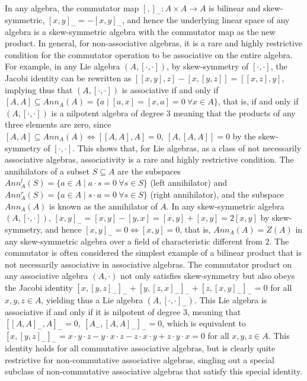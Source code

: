 \documentclass[12pt]{article}
\begin{document}
        In any algebra, the commutator map $[,]_{-}:A\times A\rightarrow A$ is bilinear and skew-symmetric, $[x,y]_{-}=-[x,y]_{-}$, and hence the underlying linear space of any algebra is a skew-symmetric algebra with the commutator map as the new product.
        In general, for non-associative algebras, it is a rare and highly restrictive condition for the commutator operation to be associative on the entire algebra.
         For example, in any Lie algebra $(A,[\cdot,\cdot])$, by skew-symmetry of $[\cdot,\cdot]$, the Jacobi identity can be rewritten as $[[x,y],z]-[x,[y,z]]=[[x,z],y]$, implying thus that $(A,[\cdot,\cdot])$ is associative if and only if $[A,A]\subseteq Ann_A(A)=\{a\mid [a,x]=[x,a]=0 \ \forall x\in A\}$, that is, if and only if $(A,[\cdot,\cdot])$ is a nilpotent algebra of degree $3$ meaning that the products of any three elements are zero, since
         $[A,A]\subseteq Ann_A(A)\Leftrightarrow [[A,A],A]=0,\ [A,[A,A]]=0$ by the skew-symmetry of $[\cdot,\cdot]$. This shows that, for Lie algebras, as a class of not necessarily associative algebras, associativity is a rare and highly restrictive condition. The annihilators of a subset $S\subseteq A$ are the subspaces $Ann_A^l(S)=\{a\in A\mid a\cdot s=0\ \forall s\in S\}$ (left annihilator) and $Ann_A^r(S)=\{a\in A\mid s\cdot a=0\ \forall s\in S\}$ (right annihilator), and the subspace $Ann_A(A)$ is known as the annihilator of $A$. In any skew-symmetric algebra $(A,[\cdot,\cdot])$, $[x,y]_{-}=[x,y]-[y,x]=[x,y]+[x,y]=2[x,y]$ by skew-symmetry, and hence $[x,y]_{-}=0 \Leftrightarrow [x,y]=0$, that is, $Ann_A(A)=Z(A)$ in any skew-symmetric algebra over a field of characteristic different from $2$.
         The commutator is often considered the simplest example of a bilinear product that is not necessarily associative in associative algebras. The commutator product on any associative algebra $(A,\cdot)$ not only satisfies skew-symmetry but also  obeys the Jacobi identity $[x,[y,z]_{-}]_{-}+[y,[z,x]_{-}]_{-}+[z,[x,y]_{-}]_{-}=0$ for all $x,y,z\in A$, yielding thus a Lie algebra
        $(A,[\cdot,\cdot]_{-})$. This Lie algebra is associative if and only if it is nilpotent of degree $3$, meaning that
        $[[A,A]_{-},A]_{-}=0,\ [A_{-},[A,A]_{-}]_{-}=0$, which is equivalent to
        $[x,[y,z]_{-}]_{-}=x\cdot y \cdot z-y\cdot x\cdot z-z\cdot x\cdot y+z\cdot y\cdot x=0$ for all $x,y,z\in A$. This identity holds for all commutative associative algebras, but is clearly quite restrictive for non-commutative associative algebras, singling out a special subclass of non-commutative associative algebras that satisfy this special identity.
\end{document}
